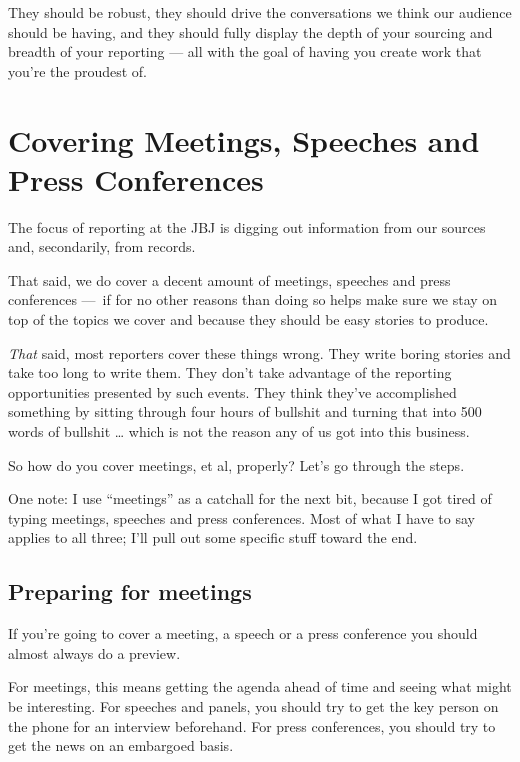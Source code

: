 \documentclass[
  11pt,
  american,
  letterpaperpaper,
  extrafontsizes,onecolumn,openright
  ]{memoir}
\begin{document}
They should be robust, they should drive the conversations we think our audience should be having, and they should fully display the depth of your sourcing and breadth of your reporting --- all with the goal of having you create work that you're the proudest of.

\hypertarget{covering-meetings-speeches-and-press-conferences}{%
\chapter{Covering Meetings, Speeches and Press Conferences}\label{covering-meetings-speeches-and-press-conferences}}

The focus of reporting at the JBJ is digging out information from our sources and, secondarily, from records.

That said, we do cover a decent amount of meetings, speeches and press conferences ---~if for no other reasons than doing so helps make sure we stay on top of the topics we cover and because they should be easy stories to produce.

\emph{That} said, most reporters cover these things wrong. They write boring stories and take too long to write them. They don't take advantage of the reporting opportunities presented by such events. They think they've accomplished something by sitting through four hours of bullshit and turning that into 500 words of bullshit \ldots{} which is not the reason any of us got into this business.

So how do you cover meetings, et al, properly? Let's go through the steps.

One note: I use \enquote{meetings} as a catchall for the next bit, because I got tired of typing meetings, speeches and press conferences. Most of what I have to say applies to all three; I'll pull out some specific stuff toward the end.

\hypertarget{preparing-for-meetings}{%
\section*{Preparing for meetings}\label{preparing-for-meetings}}

If you're going to cover a meeting, a speech or a press conference you should almost always do a preview.

For meetings, this means getting the agenda ahead of time and seeing what might be interesting. For speeches and panels, you should try to get the key person on the phone for an interview beforehand. For press conferences, you should try to get the news on an embargoed basis.
\end{document}
